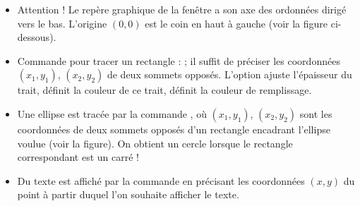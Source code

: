 \documentclass[11pt,class=report,crop=false]{standalone}
\begin{document}
\begin{cours}
\begin{itemize}
    
  \item Attention ! Le repère graphique de la fenêtre a son axe des ordonnées dirigé vers le bas. L'origine $(0,0)$ est le coin en haut à gauche (voir la figure ci-dessous). 
  
  \item Commande pour tracer un rectangle :  ; il suffit de préciser les coordonnées $(x_1,y_1)$, $(x_2,y_2)$ de deux sommets opposés. L'option  ajuste l'épaisseur du trait,  définit la couleur de ce trait,  définit la couleur de remplissage.
  
  \item Une ellipse est tracée par la commande , où $(x_1,y_1)$, $(x_2,y_2)$ sont les coordonnées de deux sommets opposés d'un rectangle encadrant l'ellipse voulue (voir la figure). On obtient un cercle lorsque le rectangle correspondant est un carré !  
  
  \item Du texte est affiché par la commande  en précisant les coordonnées $(x,y)$ du point à partir duquel l'on souhaite afficher le texte. 
  
\end{itemize}


\end{cours}


\end{document}
